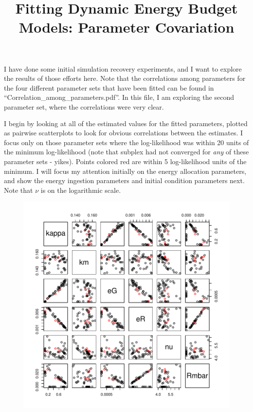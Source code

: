 \documentclass[12pt,reqno,final]{amsart}
\title[DEB fitting notes]{Fitting Dynamic Energy Budget Models:
  Parameter Covariation}
\theoremstyle{plain}
\numberwithin{equation}{part}
\begin{document}
\maketitle

I have done some initial simulation recovery experiments, and I want
to explore the results of those efforts here. Note that the
correlations among parameters for the four different parameter sets
that have been fitted can be found in
``Correlation\_among\_parameters.pdf''. In this file, I am exploring
the second parameter set, where the correlations were very clear.

I begin by looking at all of the estimated values for the fitted
parameters, plotted as pairwise scatterplots to look for obvious
correlations between the estimates. I focus only on those parameter
sets where the log-likelihood was within 20 units of the minimum
log-likelihood (note that subplex had not converged for \emph{any} of
these parameter sets - yikes). Points colored red are within 5
log-likelihood units of the minimum. I will focus my attention
initially on the energy allocation parameters, and show the energy
ingestion parameters and initial condition parameters next. Note that
$\nu$ is on the logarithmic scale.
\begin{figure}
\includegraphics{Solving_the_problem_of_parameter_covariation_4-001}
\end{figure}
\end{document}
